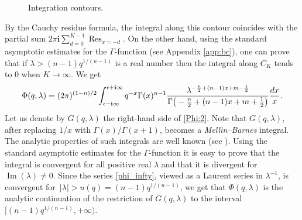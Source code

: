 \documentclass[10pt,a4paper]{article}
\numberwithin{equation}{section}
\newcommand{\ii}{\mathbf{i}}
\begin{document}
\begin{figure}[t]\centering
{}

\caption{Integration contours.}\label{Phi:contour}
\end{figure}
By the Cauchy
residue formula, the integral along this contour coincides with the
partial sum $2\pi \ii \sum_{d=0}^{K-1} \operatorname{Res}_{x=-d}$. On the
other hand, using the standard asymptotic estimates for the
$\Gamma$-function (see Appendix \ref{app:bc}), one can prove
that if $\lambda>(n-1) q^{1/(n-1)}$
is a real number then the integral along $C_K$
tends to $0$ when $K\to \infty$. We get
\begin{equation}\label{Phi:2}
\Phi(q,\lambda) =
(2\pi)^{(1-n)/2}
\int_{\epsilon -\ii\infty}^{\epsilon + \ii \infty}
q^{-x}\Gamma(x)^{n-1}
\frac{\lambda^{-\frac{n}{2}+(n-1)x+m-\frac{1}{2} } }{
\Gamma\big(-\frac{n}{2}+(n-1)x+m+\frac{1}{2} \big) }
\frac{{\rm d}x}{x}.
\end{equation}
Let us denote by $G(q,\lambda)$ the right-hand side of \eqref{Phi:2}. Note that $G(q,\lambda)$, after replacing $1/x$ with $\Gamma(x)/\Gamma(x+1)$, becomes a {\em Mellin--Barnes} integral. The analytic properties of such integrals are well known (see \cite{Bat,PK2001}). Using the standard asymptotic estimates for the $\Gamma$-function it is easy to prove that the integral is convergent for all positive real $\lambda$ and that it is divergent for $\operatorname{Im}(\lambda)\neq 0$. Since the series \eqref{phi_infty}, viewed as a Laurent series in $\lambda^{-1}$, is convergent for~${|\lambda|>u(q)=(n-1) q^{1/(n-1)}}$, we get that $\Phi(q,\lambda)$ is the analytic continuation of the restriction of $G(q,\lambda)$ to the interval $\big[(n-1) q^{1/{(n-1)}}, +\infty\big)$.
\end{document}
